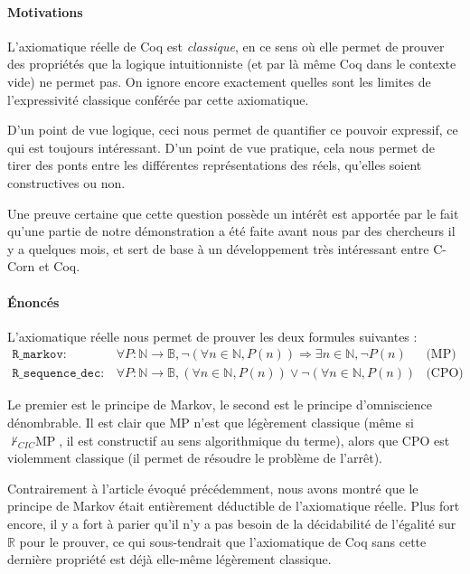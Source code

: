 \documentclass[a4paper,10pt]{article}
\begin{document}
\paragraph{Motivations}

L'axiomatique réelle de Coq est \emph{classique}, en ce sens où elle permet de prouver des propriétés que la logique intuitionniste (et par là même Coq dans le contexte vide) ne permet pas. On ignore encore exactement quelles sont les limites de l'expressivité classique conférée par cette axiomatique.

D'un point de vue logique, ceci nous permet de quantifier ce pouvoir expressif, ce qui est toujours intéressant. D'un point de vue pratique, cela nous permet de tirer des ponts entre les différentes représen\-tations des réels, qu'elles soient constructives ou non.

Une preuve certaine que cette question possède un intérêt est apportée par le fait qu'une partie de notre démonstration a été faite avant nous par des chercheurs il y a quelques mois, et sert de base à un développement très intéressant entre C-Corn et Coq.

\paragraph{Énoncés}

L'axiomatique réelle nous permet de prouver les deux formules suivantes :
$$\begin{array}{llc}
\mathtt{R\_markov} :& \forall P : \mathbb{N}\rightarrow\mathbb{B}, \neg(\forall n\in\mathbb{N}, P(n)) \Rightarrow \exists n\in\mathbb{N}, \neg P(n) & \text{(MP)}\\
\mathtt{R\_sequence\_dec} :& \forall P : \mathbb{N}\rightarrow\mathbb{B}, (\forall n\in\mathbb{N}, P(n)) \vee \neg(\forall n\in\mathbb{N}, P(n)) & \text{(CPO)}
\end{array}$$

Le premier est le principe de Markov, le second est le principe d'omniscience dénombrable. Il est clair que MP n'est que légèrement classique (même si $\not\vdash_{CIC}\text{MP}$, il est constructif au sens algorithmique du terme), alors que CPO est violemment classique (il permet de résoudre le problème de l'arrêt).

Contrairement à l'article évoqué précédemment, nous avons montré que le principe de Markov était entièrement déductible de l'axiomatique réelle. Plus fort encore, il y a fort à parier qu'il n'y a pas besoin de la décidabilité de l'égalité sur $\mathbb{R}$ pour le prouver, ce qui sous-tendrait que l'axiomatique de Coq sans cette dernière propriété est déjà elle-même légèrement classique.
\end{document}
